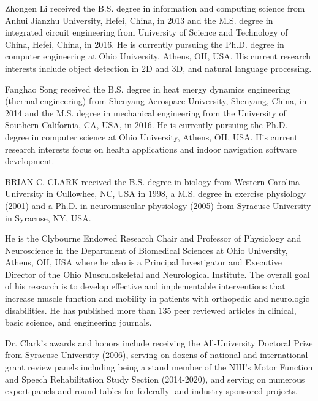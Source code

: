 \documentclass{ieeeaccess}
\begin{document}
\newpage

\begin{IEEEbiography}{Zhongen Li} received the B.S. degree in information and computing science from Anhui Jianzhu University, Hefei, China, in 2013 and the M.S. degree in integrated circuit engineering from University of Science and Technology of China, Hefei, China, in 2016. He is currently pursuing the Ph.D. degree in computer engineering at Ohio University, Athens, OH, USA. His current research interests include object detection in 2D and 3D, and natural language processing.
\end{IEEEbiography}

\begin{IEEEbiography}{Fanghao Song} 
received the B.S. degree in heat energy dynamics engineering (thermal engineering) from Shenyang Aerospace University, Shenyang, China, in 2014 and the M.S. degree in mechanical engineering from the University of Southern California, CA, USA, in 2016. He is currently pursuing the Ph.D. degree in computer science at Ohio University, Athens, OH, USA. His current research interests focus on health applications and indoor navigation software development. 
\end{IEEEbiography}

\begin{IEEEbiography}{BRIAN C. CLARK} received the B.S. degree in biology from Western Carolina University in Cullowhee, NC, USA in 1998, a M.S. degree in exercise physiology (2001) and a Ph.D. in neuromuscular physiology (2005) from Syracuse University in Syracuse, NY, USA.

He is the Clybourne Endowed Research Chair and Professor of Physiology and Neuroscience in the Department of Biomedical Sciences at Ohio University, Athens, OH, USA where he also is a Principal Investigator and Executive Director of the Ohio Musculoskeletal and Neurological Institute. The overall goal of his research is to develop effective and implementable interventions that increase muscle function and mobility in patients with orthopedic and neurologic disabilities. He has published more than 135 peer reviewed articles in clinical, basic science, and engineering journals.

Dr. Clark’s awards and honors include receiving the All-University Doctoral Prize from Syracuse University (2006), serving on dozens of national and international grant review panels including being a stand member of the NIH’s Motor Function and Speech Rehabilitation Study Section (2014-2020), and serving on numerous expert panels and round tables for federally- and industry sponsored projects.
 
\end{IEEEbiography}
\end{document}
